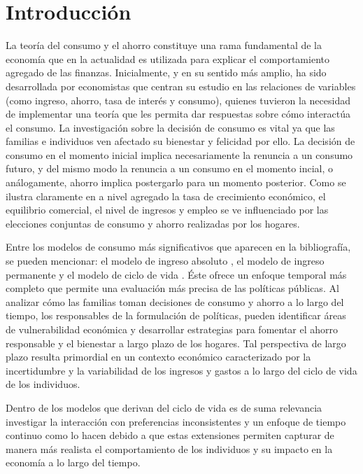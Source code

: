 \chapter*{Introducci\'on}

La teoría del consumo y el ahorro constituye una rama fundamental de la economía que en la actualidad es utilizada para explicar el comportamiento agregado de las finanzas. Inicialmente, y en su sentido más amplio, ha sido desarrollada por economistas que centran su estudio en las relaciones de variables (como ingreso, ahorro, tasa de interés y consumo), quienes tuvieron la necesidad de implementar una teoría que les permita dar respuestas sobre cómo interactúa el consumo. La investigación sobre la decisión de consumo es vital ya que las familias e individuos ven afectado su bienestar y felicidad por ello. La decisión de consumo en el momento inicial implica necesariamente la renuncia a un consumo futuro, y del mismo modo la renuncia a un consumo en el momento incial, o análogamente, ahorro implica postergarlo para un momento posterior. Como se ilustra claramente en \parencite{larrain2002macroeconomia} a nivel agregado la tasa de crecimiento económico, el equilibrio comercial, el nivel de ingresos y empleo se ve influenciado por las elecciones conjuntas de consumo y ahorro realizadas por los hogares.

Entre los modelos de consumo más significativos que aparecen en la bibliografía, se pueden mencionar: el modelo de ingreso absoluto \parencite{keynes1936general}, el modelo de ingreso permanente \parencite{friedman1957theory} y el modelo de ciclo de vida \parencite{modigliani1954utility}. Éste ofrece un enfoque temporal más completo que permite una evaluación más precisa de las políticas públicas. Al analizar cómo las familias toman decisiones de consumo y ahorro a lo largo del tiempo, los responsables de la formulación de políticas, pueden identificar áreas de vulnerabilidad económica y desarrollar estrategias para fomentar el ahorro responsable y el bienestar a largo plazo de los hogares. Tal perspectiva de largo plazo resulta primordial en un contexto económico caracterizado por la incertidumbre y la variabilidad de los ingresos y gastos a lo largo del ciclo de vida de los individuos. 

Dentro de los modelos que derivan del ciclo de vida es de suma relevancia investigar la interacción con preferencias inconsistentes y un enfoque de tiempo continuo como lo hacen \parencite{feigenbaum2021deviation} debido a que estas extensiones permiten capturar de manera más realista el comportamiento de los individuos y su impacto en la economía a lo largo del tiempo. 

